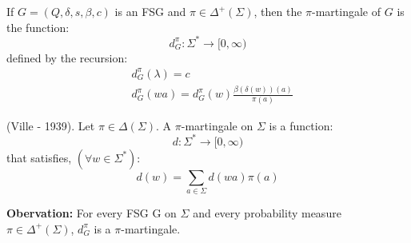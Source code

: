 \documentclass[../main.tex]{subfiles}
\begin{document}
\begin{defn}
    If $G = (Q, \delta, s, \beta, c)$ is an FSG and $\pi \in \Delta^{+}(\Sigma)$,
then the $\pi$-martingale of $G$ is the function:
\begin{equation*}
    d^{\pi}_{G}: \Sigma^{*} \rightarrow [0, \infty)
\end{equation*}
defined by the recursion:
\begin{align*}
    & d^{\pi}_{G}(\lambda) = c \\
    & d^{\pi}_{G}(wa) = d^{\pi}_{G}(w) \frac{\beta(\delta(w))(a)}{\pi(a)}
\end{align*}
\end{defn}

\begin{defn}
    (Ville - 1939). Let $\pi \in \Delta(\Sigma)$. A $\pi$-martingale on $\Sigma$
is a function:
\begin{equation*}
    d: \Sigma^{*} \rightarrow [0, \infty)
\end{equation*}
that satisfies, $(\forall w \in \Sigma^{*})$:
\begin{equation}
    d(w) = \sum_{a \in \Sigma} d(wa)\pi(a)
\end{equation}
\end{defn}

\textbf{Obervation:}
    For every FSG G on $\Sigma$ and every probability measure $\pi \in \Delta^{+}(\Sigma)$,
$d^{\pi}_{G}$ is a $\pi$-martingale.
\end{document}
